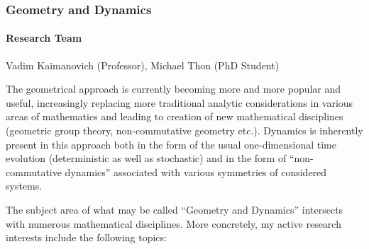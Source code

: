 \subsubsection{Geometry and Dynamics}

\paragraph{Research Team}
Vadim Kaimanovich (Professor), Michael Thon (PhD Student)

\medskip

The geometrical approach is currently becoming more and more popular
and useful, increasingly replacing more traditional analytic
considerations in various areas of mathematics and leading to
creation of new mathematical disciplines (geometric group theory,
non-commutative geometry etc.). Dynamics is inherently present in
this approach both in the form of the usual one-dimensional time
evolution (deterministic as well as stochastic) and in the form of
``non-commutative dynamics'' associated with various symmetries of
considered systems.

The subject area of what may be called ``Geometry and Dynamics''
intersects with numerous mathematical disciplines. More concretely,
my active research interests include the following topics:

